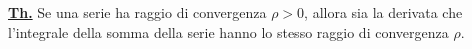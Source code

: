 \documentclass[a4paper,10pt]{article} %
\newcommand{\ltheorem}[1]{%
    {\smallbreak\par\normalsize\textbf{\underline{Th.}} {#1} \smallbreak\par}}
\begin{document}
\begin{multicols}{2}
\ltheorem{
    Se una serie ha raggio di convergenza $ \rho > 0$, allora sia la derivata che l'integrale della somma della serie hanno lo stesso raggio di convergenza $\rho$.
}




\end{multicols}


\end{document}
